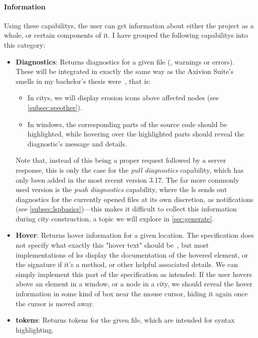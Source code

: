 \documentclass[../thesis]{subfiles}
\begin{document}
\paragraph{Information}
Using these \glspl{capability}, the user can get information about either the project as a whole, or certain components of it.
I have grouped the following \glspl{capability} into this category:
\begin{itemize}
	\item \textbf{Diagnostics}: Returns diagnostics for a given file (\eg, warnings or errors).
	      These will be integrated in exactly the same way as the Axivion Suite's \glspl{smell} in my bachelor's thesis were~\cite{galperin2021}, that is:
	      \begin{itemize}
		      \item In \glspl{city}, we will display erosion icons above affected nodes (see \cref{subsec:seeother}).
		      \item In \glspl{window}, the corresponding parts of the source code should be highlighted, while hovering over the highlighted parts should reveal the diagnostic's message and details.
	      \end{itemize}
	      Note that, instead of this being a proper request followed by a server response, this is only the case for the \emph{pull diagnostics} \gls{capability}, which has only been added in the most recent version 3.17.
	      The far more commonly used version is the \emph{push diagnostics} \gls{capability}, where the \gls{ls} sends out diagnostics for the currently opened files at its own discretion, as notifications (see \cref{subsec:lspbasics})---this makes it difficult to collect this information during city construction, a topic we will explore in \cref{sec:generate}.
	\item \textbf{Hover}: Returns hover information for a given location.
	      The specification does not specify what exactly this "hover text" should be~\cite{lsp}, but most implementations of \glspl{ls} display the documentation of the hovered element, or the signature if it's a method, or other helpful associated details.
	      We can simply implement this part of the specification as intended:
	      If the user hovers above an element in a \gls{window}, or a node in a \gls{city}, we should reveal the hover information in some kind of box near the mouse cursor, hiding it again once the cursor is moved away.
	\item \textbf{\Glspl*{token}}: Returns \glspl*{token} for the given file, which are intended for syntax highlighting.

\end{itemize}
\end{document}
